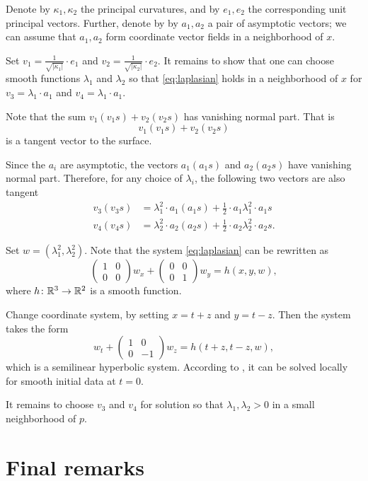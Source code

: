 \documentclass{article}
\begin{document}
Denote 
by $\kappa_1,\kappa_2$ the principal curvatures,
and by $e_1,e_2$ the corresponding unit principal vectors. 
Further, denote by by $a_1,a_2$ a pair of asymptotic vectors; we can assume that $a_1,a_2$ form coordinate vector fields in a neighborhood of $x$.


Set $v_1=\tfrac 1{\sqrt{|\kappa_1|}}\cdot e_1$ and $v_2=\tfrac 1{\sqrt{|\kappa_2|}}\cdot e_2$. 
It remains to show that one can choose smooth functions  $\lambda_1$ and $\lambda_2$ 
so that \ref{eq:laplasian}
holds in a neighborhood of $x$ for $v_3=\lambda_1\cdot a_1$ and $v_4=\lambda_1\cdot a_1$.

Note that the sum $v_1(v_1s)+v_2(v_2s)$ has vanishing normal part.
That is \[v_1(v_1s)+v_2(v_2s)\] is a tangent vector to the surface.

Since the $a_i$ are asymptotic,
the vectors $a_1(a_1s)$ and $a_2(a_2s)$ have vanishing normal part.
Therefore, for any choice of $\lambda_i$,
the following two vectors are also tangent
\begin{align*}
v_3(v_3s)&=\lambda_1^2\cdot a_1(a_1s)+\tfrac12\cdot a_1\lambda_1^2\cdot a_1s
\\
v_4(v_4s)&=\lambda_2^2\cdot a_2(a_2s)+\tfrac12\cdot a_2\lambda_2^2\cdot a_2s.
\end{align*}

Set $w=(\lambda_1^2,\lambda_2^2)$.
Note that the system \ref{eq:laplasian} can be rewritten as 
\[\left(\begin{smallmatrix}
   1&0\\0&0
  \end{smallmatrix}\right)
w_x
+
\left(\begin{smallmatrix}
   0&0\\0&1
  \end{smallmatrix}\right)
w_y=h(x,y,w),\]
where $h\colon\mathbb{R}^3\to\mathbb{R}^2$ is a smooth function.

Change coordinate system, by setting $x=t+z$ and $y=t-z$.
Then the system takes the form 
\[w_t+\left(\begin{smallmatrix}
   1&0\\0&-1
  \end{smallmatrix}\right)
w_z=h(t+z,t-z,w),\]
which is a semilinear hyperbolic system.
According to \cite[Theorem 3.6]{bressan}, it can be solved locally for smooth initial data at $t=0$.

It remains to choose $v_3$ and $v_4$ for solution so that $\lambda_1, \lambda_2>0$ in a small neighborhood of $p$.
\qeds


\section{Final remarks}\label{Final remarks}
\end{document}
